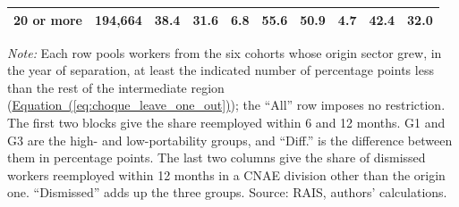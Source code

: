 {\begin{threeparttable}
\begin{tabular}{lrrrrrrrrr}
20 or more & 194,664 & 38.4 & 31.6 & 6.8 & 55.6 & 50.9 & 4.7 & 42.4 & 32.0 \\
\bottomrule
\end{tabular}
\begin{tablenotes}[flushleft]\footnotesize
\item \textit{Note:} Each row pools workers from the six cohorts whose origin sector grew, in the year of separation, at least the indicated number of percentage points less than the rest of the intermediate region (\hyperref[eq:choque_leave_one_out]{Equation~(\ref*{eq:choque_leave_one_out})}); the ``All'' row imposes no restriction. The first two blocks give the share reemployed within 6 and 12 months. G1 and G3 are the high- and low-portability groups, and ``Diff.'' is the difference between them in percentage points. The last two columns give the share of dismissed workers reemployed within 12 months in a CNAE division other than the origin one. ``Dismissed'' adds up the three groups. Source: RAIS, authors' calculations.
\end{tablenotes}
\end{threeparttable}
}
